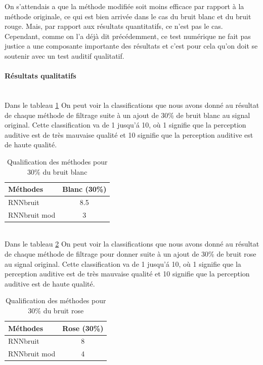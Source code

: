 \documentclass[conference,onecolumn]{IEEEtran}
\begin{document}
On s’attendais a que la méthode modifiée soit moins efficace par rapport à la méthode originale, ce qui est bien arrivée dans le cas du bruit blanc et du bruit rouge. Mais, par rapport aux résultats quantitatifs, ce n’est pas le cas. Cependant, comme on l’a déjà dit précédemment, ce test numérique ne fait pas justice a une composante importante des résultats et c’est pour cela qu’on doit se soutenir avec un test auditif qualitatif.

\paragraph{Résultats qualitatifs}
\hfill \\
Dans le tableau \ref{table:t28} On peut voir la classifications que nous avons donné au résultat de chaque méthode de filtrage suite  à un ajout de 30\% de bruit blanc au signal original. Cette classification va de 1 jusqu'á 10, où 1 signifie que la perception auditive est de très mauvaise qualité et 10 signifie que la perception auditive est de haute qualité.
\begin{table}[H]
    \centering
    \begin{tabular}{ l  c }
    \textbf{Méthodes} & \textbf{Blanc (30\%)} \\
    \hline
    RNNbruit &  8.5 \\
    RNNbruit mod &  3 \\
    \end{tabular}
    \caption{Qualification des méthodes pour 30\% du bruit blanc}
    \label{table:t28}
\end{table}
\hfill \\
Dans le tableau \ref{table:t29} On peut voir la classifications que nous avons donné au résultat de chaque méthode de filtrage pour donner suite à un ajout de 30\% de bruit rose au signal original. Cette classification va de 1 jusqu'á 10, où 1 signifie que la perception auditive est de très mauvaise qualité et 10 signifie que la perception auditive est de haute qualité.  
\begin{table}[H]
    \centering
    \begin{tabular}{ l  c }
    \textbf{Méthodes} & \textbf{Rose (30\%)} \\
    \hline
    RNNbruit &  8 \\
    RNNbruit mod &  4 \\
    \end{tabular}
    \caption{Qualification des méthodes pour 30\% du bruit rose}
    \label{table:t29}
\end{table}
\end{document}
